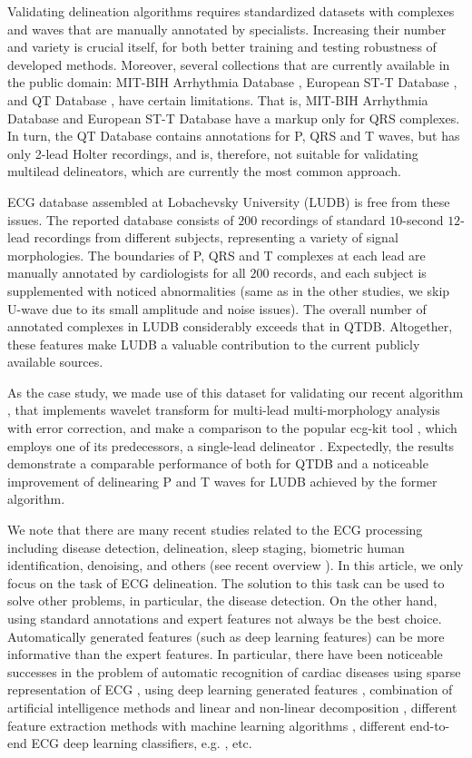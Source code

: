 \documentclass[submitted]{ieeeaccess}
\newcommand{\NewCorrection}[1]{{#1}}
\begin{document}
Validating delineation algorithms requires standardized datasets with complexes and waves that are manually annotated by specialists. Increasing their number and variety is crucial itself, for both better training and testing robustness of developed methods. Moreover, several collections that are currently available in the public domain: MIT-BIH Arrhythmia Database \cite{mitdb}, European ST-T Database \cite{edb}, and QT Database \cite{qtdb}, have certain limitations. That is, MIT-BIH Arrhythmia Database and European ST-T Database have a markup only for QRS complexes. In turn, the QT Database contains annotations for P, QRS and T waves, but has only 2-lead Holter recordings, and is, therefore, not suitable for validating multilead delineators, which are currently the most common approach.   


ECG database assembled at Lobachevsky University (LUDB) is free from these issues. The reported database consists of $200$ recordings of standard $10$-second $12$-lead recordings \cite{IEC} from different subjects, representing a variety of signal morphologies. The boundaries of P, QRS and T complexes at each lead are manually annotated by cardiologists for all $200$ records, and each subject is supplemented with noticed abnormalities (same as in the other studies, we skip U-wave due to its small amplitude and noise issues). The overall number of annotated complexes in LUDB considerably exceeds that in QTDB. Altogether, these features make LUDB a valuable contribution to the current publicly available sources. 

As the case study, we made use of this dataset for validating our recent algorithm \cite{Kalyakulina2018}, that implements wavelet transform for multi-lead multi-morphology analysis with error correction, and make a comparison to the popular ecg-kit tool \cite{ECGKit}, which employs one of its predecessors, a single-lead delineator \cite{Martinez2004}. Expectedly, the results demonstrate a comparable performance of both for \NewCorrection{QTDB} and a noticeable improvement of delinearing P and T waves for LUDB \NewCorrection{achieved} by the former algorithm. 

\NewCorrection{We note that there are many recent studies related to the ECG processing including disease detection, delineation, sleep staging, biometric human identification, denoising, and others (see recent overview \cite{Hong2020}). In this article, we only focus on the task of ECG delineation. 
The solution to this task can be used to solve other problems, in particular, the disease detection. On the other hand, using standard annotations and expert features not always be the best choice. Automatically generated features (such as deep learning features) can be more informative than the expert features. In particular, there have been noticeable successes in the problem of automatic recognition of cardiac diseases using sparse representation of ECG \cite{RajRay2018}, using deep learning generated features \cite{Hong2017,Hong2019}, combination of artificial intelligence methods and linear and non-linear decomposition \cite{Abdalla2019}, different feature extraction methods with machine learning algorithms \cite{Marinho2019}, different end-to-end ECG deep learning classifiers, e.g. \cite{Xu2018,Hannun2019}, etc.}
\end{document}
